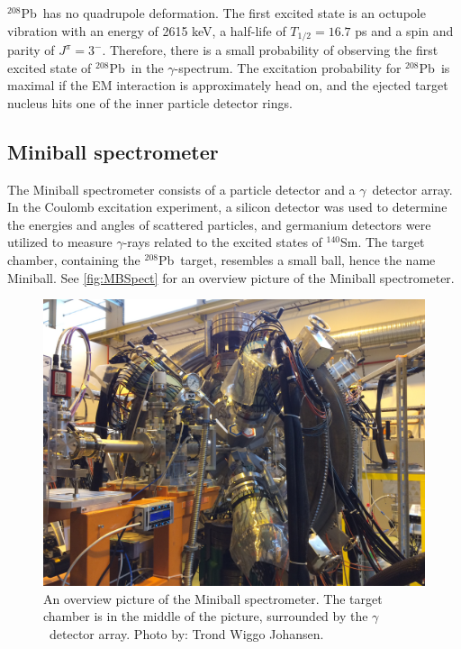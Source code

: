 \documentclass[twoside,english]{uiofysmaster/uiofysmaster}
\newcommand{\Sm}{$^{140}$Sm} %
\newcommand{\Pb}{$^{208}$Pb}
\newcommand{\ga}{$\gamma$}
\let\orgautoref\autoref
\renewcommand{\autoref}
        {%
		 \def\sectionautorefname{Section}%
		 \def\subsectionautorefname{Section}%
		 \def\subsubsectionautorefname{Section}%
		 \def\chapterautorefname{Chapter}%
          \orgautoref}
\begin{document}
\Pb\ has no quadrupole deformation.
The first excited state is an octupole vibration with an energy of 2615 keV, a half-life of $T_{1/2} = 16.7$ ps and a spin and parity of $J^\pi = 3^-$.
Therefore, there is a small probability of observing the first excited state of \Pb\ in the \ga-spectrum. 
The excitation probability for \Pb\ is maximal if the EM interaction is approximately head on, and the ejected target nucleus hits one of the inner particle detector rings.


\subsection{Miniball spectrometer}
The Miniball spectrometer consists of a particle detector and a \ga\ detector array.
In the Coulomb excitation experiment, a silicon detector was used to determine the energies and angles of scattered particles, and germanium detectors were utilized to measure \ga-rays related to the excited states of \Sm.
The target chamber, containing the \Pb\ target, resembles a small ball, hence the name Miniball.
See \autoref{fig:MBSpect} for an overview picture of the Miniball spectrometer. 


\begin{figure}[ht]
	\centering
	\includegraphics[width=\linewidth]{Images/IMG3849.JPG}
	\caption{An overview picture of the Miniball spectrometer. The target chamber is in the middle of the picture, surrounded by the \ga\ detector array. Photo by: Trond Wiggo Johansen.}
	\label{fig:MBSpect}
\end{figure}

\newpage
\end{document}
